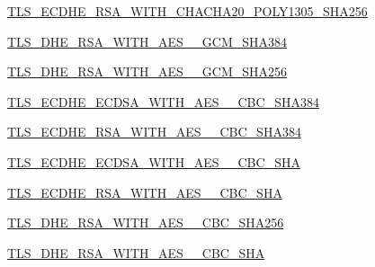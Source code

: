 \begin{DoxyCompactItemize}
\item 
\hyperlink{classpip_1_1__vendor_1_1urllib3_1_1contrib_1_1__securetransport_1_1bindings_1_1SecurityConst_abe7c3adbc0674ee0d33ea48da8a6561a}{T\+L\+S\+\_\+\+E\+C\+D\+H\+E\+\_\+\+R\+S\+A\+\_\+\+W\+I\+T\+H\+\_\+\+C\+H\+A\+C\+H\+A20\+\_\+\+P\+O\+L\+Y1305\+\_\+\+S\+H\+A256}
\item 
\hyperlink{classpip_1_1__vendor_1_1urllib3_1_1contrib_1_1__securetransport_1_1bindings_1_1SecurityConst_a0f38340e479f0ed708e0bd81e183dc0f}{T\+L\+S\+\_\+\+D\+H\+E\+\_\+\+R\+S\+A\+\_\+\+W\+I\+T\+H\+\_\+\+A\+E\+S\+\_\+\_\+\+G\+C\+M\+\_\+\+S\+H\+A384}
\item 
\hyperlink{classpip_1_1__vendor_1_1urllib3_1_1contrib_1_1__securetransport_1_1bindings_1_1SecurityConst_ac2bdd3cbd1aee5efec99f319edf73e3b}{T\+L\+S\+\_\+\+D\+H\+E\+\_\+\+R\+S\+A\+\_\+\+W\+I\+T\+H\+\_\+\+A\+E\+S\+\_\+\_\+\+G\+C\+M\+\_\+\+S\+H\+A256}
\item 
\hyperlink{classpip_1_1__vendor_1_1urllib3_1_1contrib_1_1__securetransport_1_1bindings_1_1SecurityConst_a78ac1f0398daf4b4ef75517688cb75fe}{T\+L\+S\+\_\+\+E\+C\+D\+H\+E\+\_\+\+E\+C\+D\+S\+A\+\_\+\+W\+I\+T\+H\+\_\+\+A\+E\+S\+\_\+\_\+\+C\+B\+C\+\_\+\+S\+H\+A384}
\item 
\hyperlink{classpip_1_1__vendor_1_1urllib3_1_1contrib_1_1__securetransport_1_1bindings_1_1SecurityConst_a663d75b9828e2d33c084db218d50352d}{T\+L\+S\+\_\+\+E\+C\+D\+H\+E\+\_\+\+R\+S\+A\+\_\+\+W\+I\+T\+H\+\_\+\+A\+E\+S\+\_\+\_\+\+C\+B\+C\+\_\+\+S\+H\+A384}
\item 
\hyperlink{classpip_1_1__vendor_1_1urllib3_1_1contrib_1_1__securetransport_1_1bindings_1_1SecurityConst_addca7db5908838176e703d0563bcf985}{T\+L\+S\+\_\+\+E\+C\+D\+H\+E\+\_\+\+E\+C\+D\+S\+A\+\_\+\+W\+I\+T\+H\+\_\+\+A\+E\+S\+\_\+\_\+\+C\+B\+C\+\_\+\+S\+HA}
\item 
\hyperlink{classpip_1_1__vendor_1_1urllib3_1_1contrib_1_1__securetransport_1_1bindings_1_1SecurityConst_a2e10f85c4e2f7d4b7baad470b0f15735}{T\+L\+S\+\_\+\+E\+C\+D\+H\+E\+\_\+\+R\+S\+A\+\_\+\+W\+I\+T\+H\+\_\+\+A\+E\+S\+\_\+\_\+\+C\+B\+C\+\_\+\+S\+HA}
\item 
\hyperlink{classpip_1_1__vendor_1_1urllib3_1_1contrib_1_1__securetransport_1_1bindings_1_1SecurityConst_ad2a94af03ad12c721fe62201a89f9f64}{T\+L\+S\+\_\+\+D\+H\+E\+\_\+\+R\+S\+A\+\_\+\+W\+I\+T\+H\+\_\+\+A\+E\+S\+\_\+\_\+\+C\+B\+C\+\_\+\+S\+H\+A256}
\item 
\hyperlink{classpip_1_1__vendor_1_1urllib3_1_1contrib_1_1__securetransport_1_1bindings_1_1SecurityConst_ae97684a1f3b40658073615794321a62a}{T\+L\+S\+\_\+\+D\+H\+E\+\_\+\+R\+S\+A\+\_\+\+W\+I\+T\+H\+\_\+\+A\+E\+S\+\_\+\_\+\+C\+B\+C\+\_\+\+S\+HA}

\end{DoxyCompactItemize}
